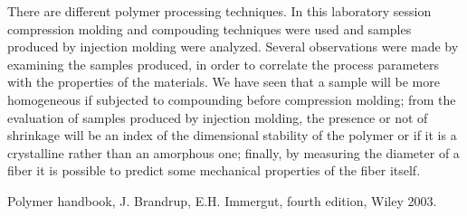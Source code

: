 \documentclass[a4paper, 11pt]{article}
\begin{document}
There are different polymer processing techniques. In this laboratory session compression molding and compouding techniques were used and samples produced by injection molding were analyzed.
Several observations were made by examining the samples produced, in order to correlate the process parameters with the properties of the materials.
We have seen that a sample will be more homogeneous if subjected to compounding before compression molding; from the evaluation of samples produced by injection molding, the presence or not of shrinkage will be an index of the dimensional stability of the polymer or if it is a crystalline rather than an amorphous one; finally, by measuring the diameter of a fiber it is possible to predict some mechanical properties of the fiber itself.

\begin{thebibliography}{1}

 Polymer handbook, J. Brandrup, E.H. Immergut, fourth edition, Wiley 2003.
\end{thebibliography}
\end{document}
